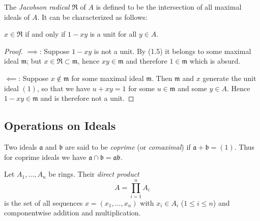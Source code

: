 The \emph{Jacobson radical} $\mathfrak{R}$ of $A$ is defined to
be the intersection of all maximal ideals of $A$. It can be
characterized as follows:
\begin{proposition}
$x\in\mathfrak{R}$ if and only if $1-xy$ is a unit for all $y\in
A$.
\end{proposition}
\begin{proof}
$\implies$: Suppose $1-xy$ is not a unit. By (1.5) it belongs to
some maximal ideal $\mathfrak{m}$; but
$x\in\mathfrak{R}\subset\mathfrak{m}$, hence $xy\in\mathfrak{m}$
and therefore $1\in\mathfrak{m}$ which is absurd.

$\impliedby$: Suppose $x\notin\mathfrak{m}$ for some maximal
ideal $\mathfrak{m}$. Then $\mathfrak{m}$ and $x$ generate the
unit ideal $(1)$, so that we have $u+xy=1$ for some
$u\in\mathfrak{m}$ and some $y\in A$. Hence $1-xy\in\mathfrak{m}$
and is therefore not a unit.
\end{proof}
\subsection{Operations on Ideals}
Two ideals $\mathfrak{a}$ and $\mathfrak{b}$ are said to be
\emph{coprime} (or \emph{comaximal}) if
$\mathfrak{a}+\mathfrak{b}=(1)$. Thus for coprime ideals we have
$\mathfrak{a}\cap\mathfrak{b}=\mathfrak{a}\mathfrak{b}$.

Let $A_1,...,A_n$ be rings. Their \emph{direct product}
\[
A=\prod_{i=1}^n A_i
\]
is the set of all sequences $x=(x_1,...,x_n)$ with $x_i\in A_i$
($1\leq i\leq n$) and componentwise addition and multiplication.

